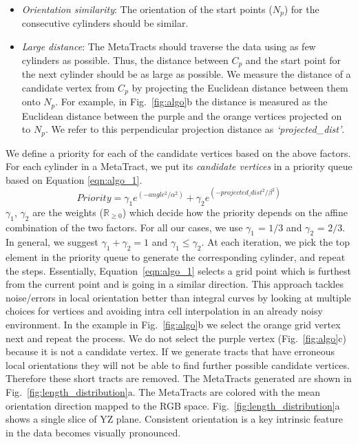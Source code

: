 \begin{itemize}[noitemsep]
\item \textit{Orientation similarity}: The orientation of the start points ($N_p$) for the consecutive cylinders should be similar. 
\item \textit{Large distance}: The MetaTracts should traverse the data using as few cylinders as possible. Thus, the distance between $C_p$ and the start point for the next cylinder should be as large as possible. We measure the distance of a candidate vertex from $C_p$ by projecting the Euclidean distance between them onto $N_p$. For example, in Fig.~\ref{fig:algo}b the distance is measured as the Euclidean distance between the purple and the orange vertices projected on to $N_p$. We refer to this perpendicular projection distance as \textit{`projected\_dist'}. 

\end{itemize}
We define a priority for each of the candidate vertices based on the above factors.
For each cylinder in a MetaTract, we put its \textit{candidate vertices} in a priority queue based on Equation \ref{eqn:algo_1}.
\begin{equation}
Priority = \gamma_1 e^{(-angle^2 / \alpha^2)} + \gamma_2e^{(-projected\_dist^2 / \beta^2)}
\label{eqn:algo_1}
\end{equation}
$\gamma_1$, $\gamma_2$ are the  weights ($\mathbb{R}_{\ge 0}$)  which decide how the priority depends on the affine combination of the two factors. For all our cases, we use $\gamma_1$ = $1 / 3 $ and $\gamma_2$ = $2 / 3$. In general, we suggest $\gamma_1 +\gamma_2 = 1 $ and $\gamma_1 \leq \gamma_2$. At each iteration, we pick the top element in the priority queue to generate the corresponding cylinder, and repeat the steps. Essentially, Equation~\ref{eqn:algo_1} selects a grid point which is furthest from the current point and is going in a similar direction. This approach tackles noise/errors in local orientation better than integral curves by looking at multiple choices for vertices and avoiding intra cell interpolation in an already noisy environment. 
% 
In the example in Fig.~\ref{fig:algo}b we select the orange grid vertex next and repeat the process. We do not select the purple vertex (Fig.~\ref{fig:algo}c) because it is not a candidate vertex. If we generate tracts that have erroneous local orientations they will not be able to find further possible candidate vertices. Therefore these short tracts are removed. The MetaTracts generated are shown in Fig.~\ref{fig:length_distribution}a. The MetaTracts are colored with the mean orientation direction mapped to the RGB space. Fig.~\ref{fig:length_distribution}a shows a single slice of YZ plane. Consistent orientation is a key intrinsic feature in the data becomes visually pronounced.
